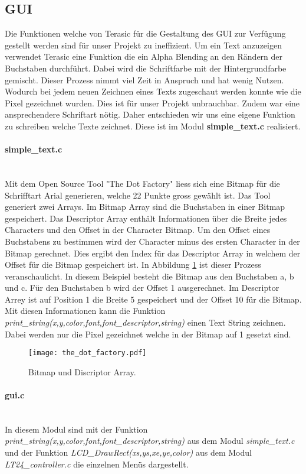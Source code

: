 \subsection{GUI}\label{subsec:gui}
Die Funktionen welche von Terasic für die Gestaltung des GUI zur Verfügung gestellt werden sind für unser Projekt zu ineffizient. Um ein Text anzuzeigen verwendet Terasic eine Funktion die ein Alpha Blending an den Rändern der Buchstaben durchführt. Dabei wird die Schriftfarbe mit der Hintergrundfarbe gemischt. Dieser Prozess nimmt viel Zeit in Anspruch und hat wenig Nutzen. Wodurch bei jedem neuen Zeichnen eines Texts zugeschaut werden konnte wie die Pixel gezeichnet wurden. Dies ist für unser Projekt unbrauchbar. Zudem war eine ansprechendere Schriftart nötig. Daher entschieden wir uns eine eigene Funktion zu schreiben welche Texte zeichnet. Diese ist im Modul \textbf{simple\_text.c} realisiert.

\paragraph{simple\_text.c}\mbox{}\\

Mit dem Open Source Tool "The Dot Factory" liess sich eine Bitmap für die Schrifftart Arial generieren, welche 22 Punkte gross gewählt ist. Das Tool generiert zwei Arrays. Im Bitmap Array sind die Buchstaben in einer Bitmap gespeichert. Das Descriptor Array enthält Informationen über die Breite jedes Characters und den Offset in der Character Bitmap. Um den Offset eines Buchstabens zu bestimmen wird der Character minus des ersten Character in der Bitmap gerechnet. Dies ergibt den Index für das Descriptor Array in welchem der Offset für die Bitmap gespeichert ist. In Abbildung \ref{img:bitmap} ist dieser Prozess veranschaulicht. In diesem Beispiel besteht die Bitmap aus den Buchstaben a, b und c. Für den Buchstaben b wird der Offset 1 ausgerechnet. Im Descriptor Arrey ist auf Position 1 die Breite 5 gespeichert und der Offset 10 für die Bitmap. Mit diesen Informationen kann die Funktion \textit{print\_string(x,y,color,font,font\_descriptor,string)} einen Text String zeichnen. Dabei werden nur die Pixel gezeichnet welche in der Bitmap auf 1 gesetzt sind.

\begin{figure}[h]
	\centering
	\texttt{[image: the\_dot\_factory.pdf]}
	\caption{Bitmap und Discriptor Array.}
	\label{img:bitmap}
\end{figure}

\paragraph{gui.c} \mbox{}\\
In diesem Modul sind mit der Funktion \textit{print\_string(x,y,color,font,font\_descriptor,string)} aus dem Modul  \textit{simple\_text.c} und der Funktion \textit{LCD\_DrawRect(xs,ys,xe,ye,color)} aus dem Modul \textit{LT24\_controller.c} die einzelnen Menüs dargestellt. 